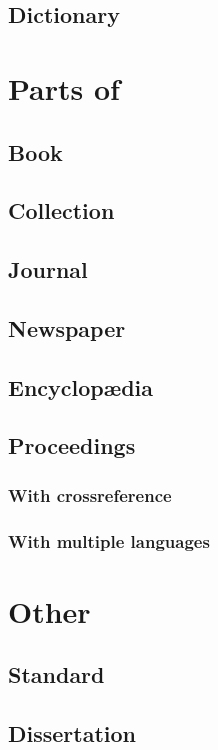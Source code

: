 \subsection{Dictionary}
\section{Parts of}
\subsection{Book}
\subsection{Collection}
\subsection{Journal}
\subsection{Newspaper}
\subsection{Encyclop\ae dia}
\subsection{Proceedings}
\subsubsection{With crossreference}
\subsubsection{With multiple languages}
\section{Other}
\subsection{Standard}
\subsection{Dissertation}
